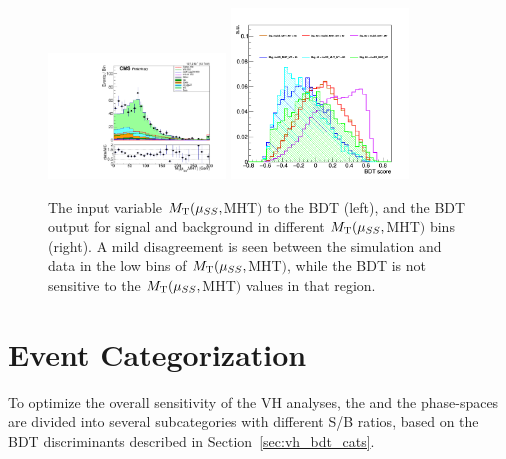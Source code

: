 \begin{figure}[!htb]
  \centering
  \captionsetup{justification=justified}
  \includegraphics[width=0.42\textwidth]{pics/VH_sec/valid_BDT_WH/muSS_MHT_MT.pdf}
  \includegraphics[width=0.42\textwidth]{pics/VH_sec/valid_BDT_WH/check_MT_plot.png}
  \caption{The input variable $M_{\mathrm{T}}(\mu_{SS}, $MHT$)$ to the \WH BDT (left), 
           and the BDT output for signal and background in different $M_{\mathrm{T}}(\mu_{SS}, $MHT$)$ bins (right).
           A mild disagreement is seen between the simulation and data in the low bins of $M_{\mathrm{T}}(\mu_{SS}, $MHT$)$,
           while the BDT is not sensitive to the $M_{\mathrm{T}}(\mu_{SS}, $MHT$)$ values in that region.}
  \label{fig:wh_MT_check}
\end{figure}

\clearpage
\section{Event Categorization}\label{sec:vh_event_cats}

To optimize the overall sensitivity of the VH analyses, 
the \WH and the \ZH phase-spaces are divided into several subcategories with different S/B ratios, 
based on the BDT discriminants described in Section~\ref{sec:vh_bdt_cats}. 
 
